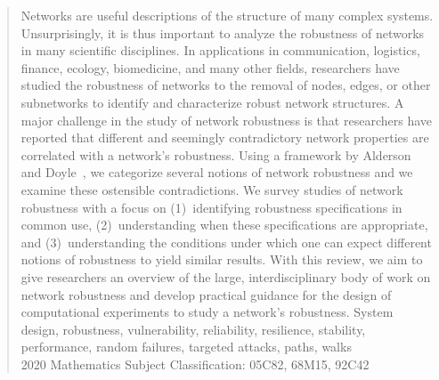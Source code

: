 \documentclass{comnet-mod}
\begin{document}
\maketitle

\begin{abstract}
{
Networks are useful descriptions of the structure of many complex systems. Unsurprisingly, it is thus important to analyze the robustness of networks in many scientific disciplines. In applications in communication, logistics, finance, ecology, biomedicine, and many other fields, researchers have studied the robustness of networks to the removal of nodes, edges, or other subnetworks to identify and characterize robust network structures. A major challenge in the study of network robustness is that researchers have reported that
different and seemingly contradictory network properties are correlated with a network's robustness. 
Using a framework by Alderson and Doyle~\cite{Alderson2010},  we categorize several notions of network robustness and we examine these ostensible contradictions.
We survey studies of network robustness with a focus on (1)~identifying robustness specifications in common use,
(2)~understanding when these specifications are appropriate, and (3)~understanding the conditions under which one can expect different notions of robustness to yield similar results. With this review, we aim to give researchers an overview of the large, interdisciplinary body of work on network robustness and develop practical guidance for the design of computational experiments to study a network's robustness.
}
{System design, robustness, vulnerability, reliability, resilience, stability, performance, random failures, targeted attacks, paths, walks}
\\
2020 Mathematics Subject Classification: 05C82, 68M15, 92C42
\end{abstract}

\tableofcontents
\end{document}
